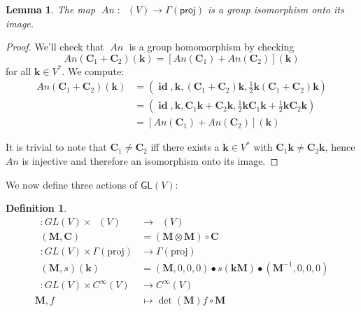 \documentclass[12pt]{article}
\newcounter{counter}
\theoremstyle{definition}
\newtheorem{dfn}[counter]{Definition}
\theoremstyle{plain}
\newtheorem{lem}[counter]{Lemma}
\newcommand{\Sym}{\mathop{\mathrm{Sym}_2}}
\newcommand{\id}{\mathop{\mathbf{id}}\nolimits}
\newcommand{\ActSym}
{\mathop{\mathrm{Act}_{\mathrm{Sym}}}}
\newcommand{\ActSec}
{\mathop{\mathrm{Act}_{\mathrm{Sec}}}}
\newcommand{\ActFun}
{\mathop{\mathrm{Act}_{\mathrm{Fun}}}}
\newcommand{\An}{\mathop{\mathit{An}}}
\begin{document}
\begin{lem}\label{lem:HomImg}
The map \(\An \colon \Sym (V)\to \Gamma(\mathsf{proj})\)
is a group isomorphism onto its image.
\end{lem}

\begin{proof}
We'll check that $\An$ is a group homomorphism by checking
\begin{equation} \label{sumofsectionsequality}
An(\mathbf{C}_1+\mathbf{C}_2) (\mathbf{k})= [An(\mathbf{C}_1) + An(\mathbf{C}_2)](\mathbf{k}) 
\end{equation}
for all \(\mathbf{k} \in V^*\). We compute:
\begin{align}
An(\mathbf{C}_1+\mathbf{C}_2)(\mathbf{k}) &= (\id,\mathbf{k},(\mathbf{C}_1+\mathbf{C}_2)\mathbf{k},\frac{1}{2}\mathbf{k}(\mathbf{C}_1+\mathbf{C}_2)\mathbf{k})\\
&=(\id,\mathbf{k},\mathbf{C}_1\mathbf{k}+\mathbf{C}_2\mathbf{k},\frac{1}{2}\mathbf{k}\mathbf{C}_1\mathbf{k}+\frac{1}{2}\mathbf{k}\mathbf{C}_2\mathbf{k})\\
&=[An(\mathbf{C}_1)+An(\mathbf{C}_2)](\mathbf{k})
\end{align}

It is trivial to note that $\mathbf{C}_1\neq\mathbf{C}_2$ iff there exists a $\mathbf{k}\in V^*$ with $\mathbf{C}_1\mathbf{k}\neq\mathbf{C}_2\mathbf{k}$, hence $An$ is injective and therefore an isomorphism onto its image.
\end{proof}

We now define three actions of \(\mathsf{GL}(V)\):\\
\begin{dfn} \label{def:ActSymSec}
    \begin{align}
        \ActSym \colon GL(V) \times \Sym (V) &\to \Sym (V) \\
        \ActSym (\mathbf{M}, \mathbf{C}) &= (\mathbf{M} \otimes \mathbf{M}) \circ \mathbf{C} \\
        \ActSec \colon GL(V) \times \Gamma(\mathrm{proj}) &\to \Gamma(\mathrm{proj}) \\
        \ActSec (\mathbf{M}, s)(\mathbf{k}) &= (\mathbf{M}, 0, 0, 0) \bullet s(\mathbf{kM}) \bullet (\mathbf{M}^{-1}, 0, 0, 0) \\
        \ActFun : GL(V) \times C^{\infty} (V) &\to C^{\infty} (V) \label{def:ActFun}\\
    \mathbf{M}, f &\mapsto \det(\mathbf{M})f \circ \mathbf{M}
    \end{align}
\end{dfn}
\end{document}
